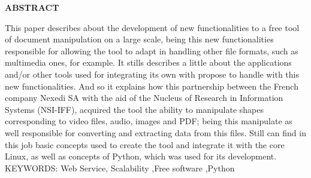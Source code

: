 \begin{center}
\textbf{ABSTRACT}
\end{center}

\singlespacing

\noindent This paper describes about the development of new functionalities to a free tool of document manipulation on a large scale, being this new functionalities responsible for allowing the tool to adapt in handling other file formats, such as multimedia ones, for example. It stills describes a little about the applications and/or other tools used for integrating its own with propose to handle with this new functionalities. And so it explains how this partnership between the French company Nexedi SA with the aid of the Nucleus of Research in Information Systems (NSI-IFF), acquired the tool the ability to manipulate shapes corresponding to video files, audio, images and PDF; being this manipulate as well responsible for converting and extracting data from this files. Still can find in this job basic concepts used to create the tool and integrate it with the core Linux, as well as concepts of Python, which was used for its development. \\

\noindent KEYWORDS: Web Service, Scalability ,Free software ,Python

